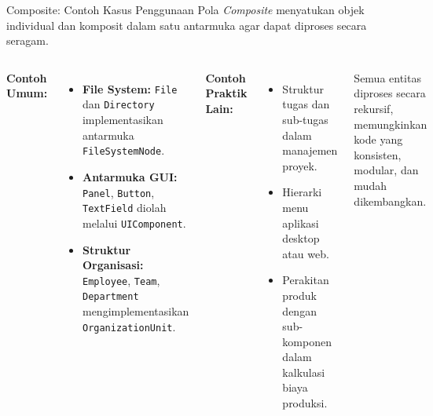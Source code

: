 \documentclass[aspectratio=169, table]{beamer}
\begin{document}
\begin{frame}[fragile]{Composite: Contoh Kasus Penggunaan}
	\vspace{20pt}
	Pola \textit{Composite} menyatukan objek individual dan komposit dalam satu antarmuka agar dapat diproses secara seragam.
	
	\begin{columns}[T]
		\textbf{Contoh Umum:}
		\begin{itemize}
			\item \textbf{File System:} \texttt{File} dan \texttt{Directory} implementasikan antarmuka \texttt{FileSystemNode}.
			\item \textbf{Antarmuka GUI:} \texttt{Panel}, \texttt{Button}, \texttt{TextField} diolah melalui \texttt{UIComponent}.
			\item \textbf{Struktur Organisasi:} \texttt{Employee}, \texttt{Team}, \texttt{Department} mengimplementasikan \texttt{OrganizationUnit}.
		\end{itemize}
		
		\textbf{Contoh Praktik Lain:}
		\begin{itemize}
			\item Struktur tugas dan sub-tugas dalam manajemen proyek.
			\item Hierarki menu aplikasi desktop atau web.
			\item Perakitan produk dengan sub-komponen dalam kalkulasi biaya produksi.
		\end{itemize}
		
		\vspace{5pt}
		Semua entitas diproses secara rekursif, memungkinkan kode yang konsisten, modular, dan mudah dikembangkan.
	\end{columns}
\end{frame}
\end{document}
